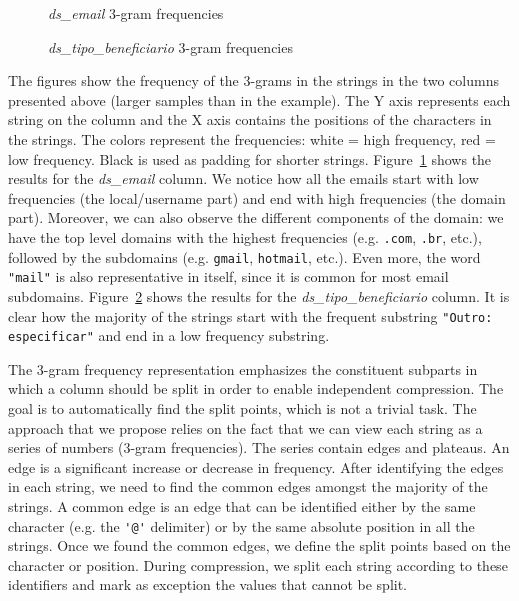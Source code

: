 \begin{appendices}
\begin{figure}[h]
  \centering
  \makebox[\textwidth][c]{
    
  }
  \caption{\textit{ds\_email} 3-gram frequencies}
  \label{fig:appendix:ngramanalysis:ngram_1}
\end{figure}

\begin{figure}[h]
  \centering
  \makebox[\textwidth][c]{
    
  }
  \caption{\textit{ds\_tipo\_beneficiario} 3-gram frequencies}
  \label{fig:appendix:ngramanalysis:ngram_2}
\end{figure}

The figures show the frequency of the 3-grams in the strings in the two columns presented above (larger samples than in the example). The Y axis represents each string on the column and the X axis contains the positions of the characters in the strings. The colors represent the frequencies: white = high frequency, red = low frequency. Black is used as padding for shorter strings. Figure~\ref{fig:appendix:ngramanalysis:ngram_1} shows the results for the \textit{ds\_email} column. We notice how all the emails start with low frequencies (the local/username part) and end with high frequencies (the domain part). Moreover, we can also observe the different components of the domain: we have the top level domains with the highest frequencies (e.g. \verb|.com|, \verb|.br|, etc.), followed by the subdomains (e.g. \verb|gmail|, \verb|hotmail|, etc.). Even more, the word \verb|"mail"| is also representative in itself, since it is common for most email subdomains. Figure~\ref{fig:appendix:ngramanalysis:ngram_2} shows the results for the \textit{ds\_tipo\_beneficiario} column. It is clear how the majority of the strings start with the frequent substring \verb|"Outro: especificar"| and end in a low frequency substring.

The 3-gram frequency representation emphasizes the constituent subparts in which a column should be split in order to enable independent compression. The goal is to automatically find the split points, which is not a trivial task. The approach that we propose relies on the fact that we can view each string as a series of numbers (3-gram frequencies). The series contain edges and plateaus. An edge is a significant increase or decrease in frequency. After identifying the edges in each string, we need to find the common edges amongst the majority of the strings. A common edge is an edge that can be identified either by the same character (e.g. the \verb|'@'| delimiter) or by the same absolute position in all the strings. Once we found the common edges, we define the split points based on the character or position. During compression, we split each string according to these identifiers and mark as exception the values that cannot be split.


\end{appendices}

